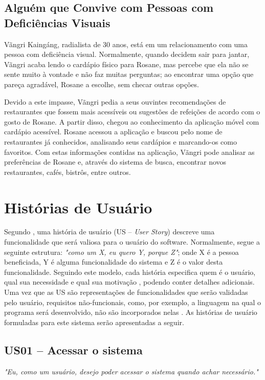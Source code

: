 \subsection{Alguém que Convive com Pessoas com Deficiências Visuais}
Vãngri Kaingáng, radialista de 30 anos, está em um relacionamento com uma pessoa com deficiência visual. Normalmente, quando decidem sair para jantar, Vãngri acaba lendo o cardápio físico para Rosane, mas percebe que ela não se sente muito à vontade e não faz muitas perguntas; ao encontrar uma opção que pareça agradável, Rosane a escolhe, sem checar outras opções.

Devido a este impasse, Vãngri pedia a seus ouvintes recomendações de restaurantes que fossem mais acessíveis ou sugestões de refeições de acordo com o gosto de Rosane. A partir disso, chegou ao conhecimento da aplicação móvel com cardápio acessível. Rosane acessou a aplicação e buscou pelo nome de restaurantes já conhecidos, analisando seus cardápios e marcando-os como favoritos. Com estas informações contidas na aplicação, Vãngri pode analisar as preferências de Rosane e, através do sistema de busca, encontrar novos restaurantes, cafés, bistrôs, entre outros.

\section{Histórias de Usuário}

Segundo \cite{COHN2004}, uma história de usuário (US -- \emph{User Story}) descreve uma funcionalidade que será valiosa para o usuário do software. Normalmente, segue a seguinte estrutura: \textit{"como um X, eu quero Y, porque Z"}; onde X é a pessoa beneficiada, Y é alguma funcionalidade do sistema e Z é o valor desta funcionalidade. Seguindo este modelo, cada história especifica quem é o usuário, qual sua necessidade e qual sua motivação \cite{AUDY2015}, podendo conter detalhes adicionais. Uma vez que as US são representações de funcionalidades que serão validadas pelo usuário, requisitos não-funcionais, como, por exemplo, a linguagem na qual o programa será desenvolvido, não são incorporados nelas \cite{COHN2004}. As histórias de usuário formuladas para este sistema serão apresentadas a seguir.

\subsection{US01 -- Acessar o sistema}

\textit{"Eu, como um usuário, desejo poder acessar o sistema quando achar necessário."}

